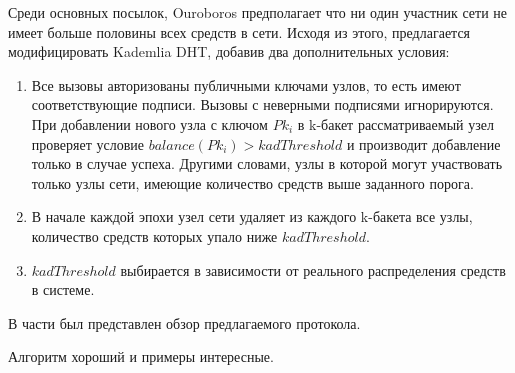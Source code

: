 \documentclass[specification,annotation]{itmo-student-thesis}
\begin{document}
Среди основных посылок, Ouroboros предполагает что ни один участник
сети не имеет больше половины всех средств в сети. Исходя из этого,
предлагается модифицировать Kademlia DHT, добавив два дополнительных условия:
\begin{enumerate}
\item Все вызовы авторизованы публичными ключами узлов, то есть имеют
  соответствующие подписи. Вызовы с неверными подписями
  игнорируются. При добавлении нового узла с ключом $Pk_i$ в k-бакет
  рассматриваемый узел проверяет условие $balance(Pk_i) >
  kadThreshold$ и производит добавление только в случае
  успеха. Другими словами, узлы в которой могут участвовать только
  узлы сети, имеющие количество средств выше заданного порога.
\item В начале каждой эпохи узел сети удаляет из каждого k-бакета все
  узлы, количество средств которых упало ниже $kadThreshold$.
\item $kadThreshold$ выбирается в зависимости от реального
  распределения средств в системе.
\end{enumerate}

\chapterconclusion

В части был представлен обзор предлагаемого протокола.

\startconclusionpage

Алгоритм хороший и примеры интересные.

\printmainbibliography
\end{document}
